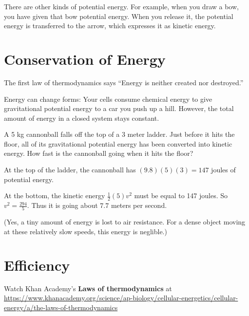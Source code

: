 There are other kinds of potential energy. For example, when you draw
a bow, you have given that bow potential energy. When you release it,
the potential energy is transferred to the arrow, which expresses it
as kinetic energy.

\section{Conservation of Energy}

The first law of thermodynamics says ``Energy is neither created nor
destroyed.''

Energy can change forms: Your cells consume chemical energy to give
gravitational potential energy to a car you push up a hill. However, the total amount of
energy in a closed system stays constant.

\begin{Exercise}[title={The Energy of Falling}, label=energy_falling]
  
A 5 kg cannonball falls off the top of a 3 meter ladder. Just before
it hits the floor, all of its gravitational potential energy has been
converted into kinetic energy.  How fast is the cannonball going when
it hits the floor?

\end{Exercise}
\begin{Answer}[ref=energy_falling]

  At the top of the ladder, the cannonball has $(9.8)(5)(3) = 147$ joules of potential energy.

  At the bottom, the kinetic energy $\frac{1}{2}(5)v^2$ must be equal
  to 147 joules. So $v^2 = \frac{294}{5}$.  Thus it is going about
  $7.7$ meters per second.

  (Yes, a tiny amount of energy is lost to air resistance. For a dense
  object moving at these relatively slow speeds, this energy is
  neglible.)
  
\end{Answer}


\section{Efficiency}


Watch Khan Academy's \textbf{Laws of thermodynamics} at \url{https://www.khanacademy.org/science/ap-biology/cellular-energetics/cellular-energy/a/the-laws-of-thermodynamics}


